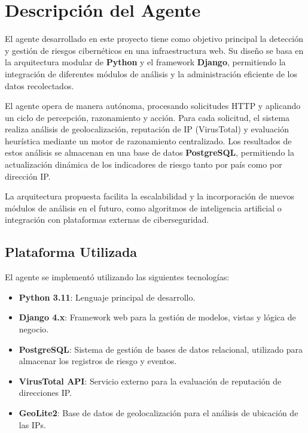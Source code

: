 \section{Descripción del Agente}

El agente desarrollado en este proyecto tiene como objetivo principal la detección y gestión de riesgos cibernéticos en una infraestructura web. Su diseño se basa en la arquitectura modular de \textbf{Python} y el framework \textbf{Django}, permitiendo la integración de diferentes módulos de análisis y la administración eficiente de los datos recolectados.

El agente opera de manera autónoma, procesando solicitudes HTTP y aplicando un ciclo de percepción, razonamiento y acción. Para cada solicitud, el sistema realiza análisis de geolocalización, reputación de IP (VirusTotal) y evaluación heurística mediante un motor de razonamiento centralizado. Los resultados de estos análisis se almacenan en una base de datos \textbf{PostgreSQL}, permitiendo la actualización dinámica de los indicadores de riesgo tanto por país como por dirección IP\@{}.

La arquitectura propuesta facilita la escalabilidad y la incorporación de nuevos módulos de análisis en el futuro, como algoritmos de inteligencia artificial o integración con plataformas externas de ciberseguridad.

\subsection{Plataforma Utilizada}

El agente se implementó utilizando las siguientes tecnologías:

\begin{itemize}
    \item \textbf{Python 3.11}: Lenguaje principal de desarrollo.
    \item \textbf{Django 4.x}: Framework web para la gestión de modelos, vistas y lógica de negocio.
    \item \textbf{PostgreSQL}: Sistema de gestión de bases de datos relacional, utilizado para almacenar los registros de riesgo y eventos.
    \item \textbf{VirusTotal API}: Servicio externo para la evaluación de reputación de direcciones IP\@{}.
    \item \textbf{GeoLite2}: Base de datos de geolocalización para el análisis de ubicación de las IPs.
\end{itemize}

